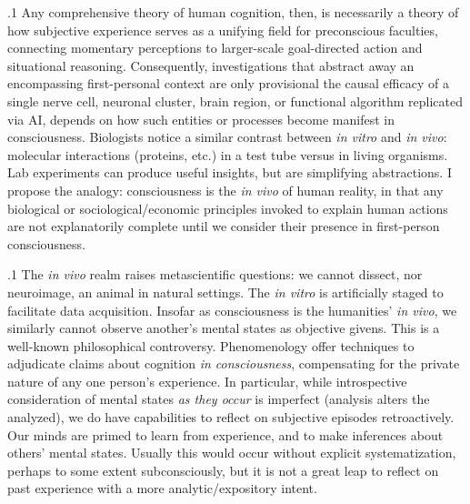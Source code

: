 \documentclass[11pt, twocolumn]{article}
\begin{document}
\p.1{%
Any comprehensive theory of human cognition, then, is necessarily a
theory of how subjective experience serves as a unifying
field for preconscious faculties, connecting momentary
perceptions to larger-scale goal-directed action and
situational reasoning.  Consequently, investigations
that abstract away an encompassing first-personal context
are only provisional \mdash{} the causal efficacy of a single
nerve cell, neuronal cluster, brain region, or
functional algorithm replicated via AI, depends on
how such entities or processes become manifest in
consciousness.  Biologists notice a similar contrast
between \textit{in vitro} and \textit{in vivo}: molecular
interactions (proteins, etc.) in a test tube versus
in living organisms.  Lab experiments can produce useful
insights, but are simplifying abstractions.  I propose
the analogy: consciousness is the \textit{in vivo} of human
reality, in that any biological or sociological/economic
principles invoked to explain human actions are not explanatorily
complete until we consider their presence in
first-person consciousness.
} %

\p.1{%
The \textit{in vivo} realm raises metascientific
questions: we cannot dissect, nor neuroimage, an animal in
natural settings.  The \textit{in vitro} is artificially
staged to facilitate data acquisition.  Insofar as
consciousness is the humanities' \textit{in vivo}, we similarly
cannot observe another's mental states as objective givens.
This is a well-known philosophical controversy.  Phenomenology
offer techniques to adjudicate claims about cognition
\textit{in consciousness}, compensating for the private nature
of any one person's experience.  In particular, while introspective
consideration of mental states \textit{as they occur} is imperfect
(analysis alters the analyzed), we do have capabilities to
reflect on subjective episodes retroactively.  Our minds are primed to learn
from experience, and to make inferences about others'
mental states.  Usually this would occur
without explicit systematization, perhaps to some
extent subconsciously, but it is not a great leap
to reflect on past experience with a more
analytic/expository intent.
} %
\end{document}
